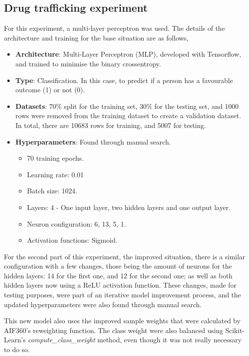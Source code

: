 \documentclass[fleqn,10pt]{wlscirep}
\begin{document}
\subsection{Drug trafficking experiment}

For this experiment, a multi-layer perceptron was used. The details of the architecture and training for the base situation are as follows,

\begin{itemize}
        \item \textbf{Architecture}: Multi-Layer Perceptron (MLP), developed with Tensorflow, and trained to minimise the binary crossentropy.
        \item \textbf{Type}: Classification. In this case, to predict if a person has a favourable outcome (1) or not (0).
        \item \textbf{Datasets}: 70\% split for the training set, 30\% for the testing set, and 1000 rows were removed from the training dataset to create a validation dataset. In total, there are 10683 rows for training, and 5007 for testing.
        \item \textbf{Hyperparameters}: Found through manual search.
            \begin{itemize}
                \item 70 training epochs.
                \item Learning rate: 0.01
                \item Batch size: 1024.
                \item Layers: 4 - One input layer, two hidden layers and one output layer.
                \item Neuron configuration: 6, 13, 5, 1.
                \item Activation functions: Sigmoid.
            \end{itemize}
\end{itemize}

For the second part of this experiment, the improved situation, there is a similar configuration with a few changes, those being the amount of neurons for the hidden layers: 14 for the first one, and 12 for the second one; as well as both hidden layers now using a ReLU activation function. These changes, made for testing purposes, were part of an iterative model improvement process, and the updated hyperparameters were also found through manual search.

This new model also uses the improved sample weights that were calculated by AIF360's reweighting function. The class weight were also balanced using Scikit-Learn's \textit{compute\_class\_weight} method, even though it was not really necessary to do so.
\end{document}
